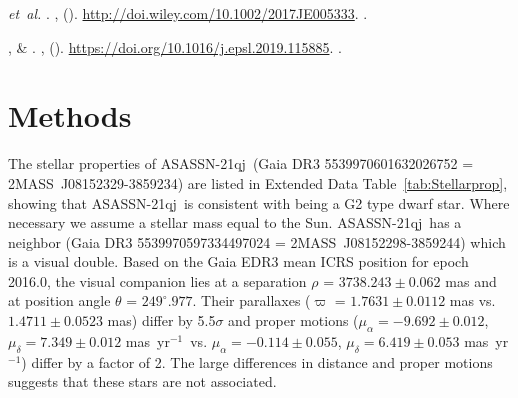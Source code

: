 \documentclass[sn-nature]{sn-jnl}%
\newcommand{\asas}{ASASSN-21qj}
\newcommand{\masyr}{mas~yr$^{-1}$}
\begin{document}
\begin{thebibliography}{10}
 \emph{et~al.}
\newblock {}.
\newblock \emph{}
  \textbf{}, 
  ().
\newblock \urlprefix\url{http://doi.wiley.com/10.1002/2017JE005333}.
\newblock {}.

,  \&
\newblock {}.
\newblock \emph{}
  \textbf{}, 
  ().
\newblock \urlprefix\url{https://doi.org/10.1016/j.epsl.2019.115885}.
\newblock {}.


\end{thebibliography}

\clearpage





\setcounter{figure}{0}    

\renewcommand\figurename{Extended Data Fig.}%
\renewcommand\tablename{Extended Data Table}%


\section{Methods}\label{sec:methods}

The stellar properties of \asas\ (Gaia DR3 5539970601632026752 = 2MASS~J08152329-3859234) are listed in Extended Data Table~\ref{tab:Stellarprop}, showing that \asas\ is consistent with being a G2 type dwarf star.
%
Where necessary we assume a stellar mass equal to the Sun.
%
\asas\  has a neighbor (Gaia DR3 5539970597334497024 = 2MASS~J08152298-3859244) which is a visual double.
%
Based on the Gaia EDR3 mean ICRS position for epoch 2016.0, the visual companion lies at a separation $\rho$ = $3738.243\pm0.062$ mas and at position angle $\theta$ = $249^{\circ}.977$.
%
Their parallaxes ($\varpi$ = $1.7631\pm0.0112$ mas vs. $1.4711\pm0.0523$ mas) differ by 5.5$\sigma$ and proper motions ($\mu_{\alpha} = -9.692\pm0.012$, $\mu_{\delta} = 7.349\pm0.012$ \masyr\, vs. $\mu_{\alpha} = -0.114\pm0.055$, $\mu_{\delta} = 6.419\pm0.053$ \masyr) differ by a factor of 2.
%
The large differences in distance and proper motions suggests that these stars are not associated.
\end{document}
